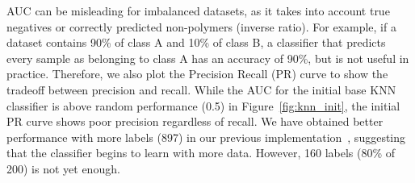 AUC can be misleading for imbalanced datasets, 
as it takes into account true negatives or correctly predicted non-polymers (inverse ratio).
For example, if a dataset contains 90\% of class A and 10\% of class B, 
a classifier that predicts every sample as belonging to class A has an accuracy of 90\%, 
but is not useful in practice.
Therefore, we also plot the Precision Recall (PR) curve to show the tradeoff between precision and recall. %
While the AUC for the initial base KNN classifier is above random performance (0.5) in Figure~\ref{fig:knn_init}, 
the initial PR curve shows poor precision regardless of recall.
We have obtained better performance with more labels (897) in our previous implementation~\cite{tchoua2019polyner}, suggesting that the classifier begins to learn with more data. 
However, 160 labels (80\% of 200) is not yet enough. %



